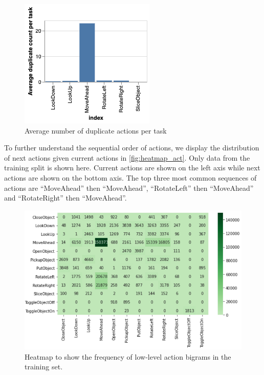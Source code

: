 \documentclass[11pt,a4paper]{article}
\begin{document}
\begin{figure}
    \centering
    \includegraphics[width=\linewidth]{Reports/1-Task-Definition-and-Data/duplicate_distrib.png}
    \caption{Average number of duplicate actions per task}
    \label{fig:duplicate_dist}
\end{figure}

To further understand the sequential order of actions, we display the distribution of next actions given current actions in \autoref{fig:heatmap_act}. Only data from the training split is shown here. Current actions are shown on the left axis while next actions are shown on the bottom axis. The top three most common sequences of actions are ``MoveAhead'' then ``MoveAhead'', ``RotateLeft'' then ``MoveAhead'' and ``RotateRight'' then ``MoveAhead''.
\begin{figure}
    \centering
    \includegraphics[width=\linewidth]{Reports/1-Task-Definition-and-Data/heatmap_actions.png}
    \caption{Heatmap to show the frequency of low-level action bigrams in the training set.}
    \label{fig:heatmap_act}
\end{figure}
\end{document}
